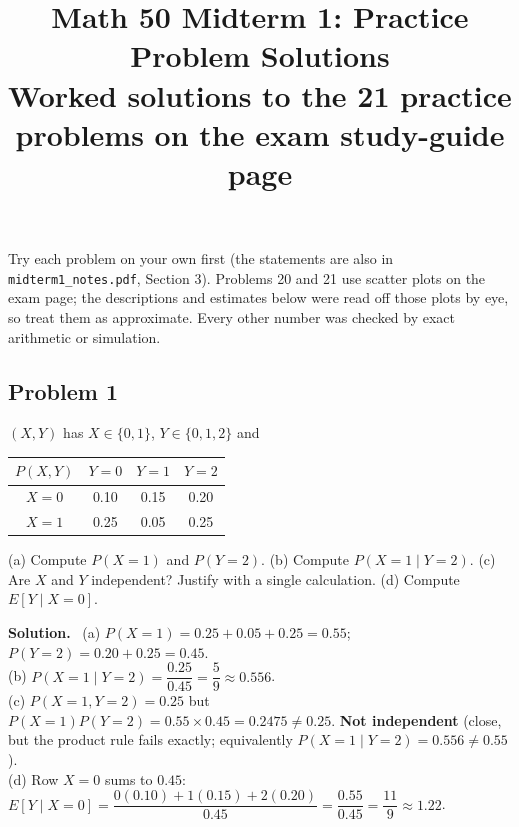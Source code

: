 \documentclass[11pt]{article}
\title{\textbf{Math 50 Midterm 1: Practice Problem Solutions}\\[2pt]\large Worked solutions to the 21 practice problems on the exam study-guide page}
\author{}
\date{}
\newenvironment{soln}{\par\smallskip\noindent\textbf{Solution.}\ }{\par\medskip}
\begin{document}
\maketitle
\thispagestyle{fancy}
\begin{tipbox}[title={Read this first}]
Try each problem on your own first (the statements are also in \texttt{midterm1\_notes.pdf}, Section 3). Problems 20 and 21 use scatter plots on the
exam page; the descriptions and estimates below were read off those plots by eye, so treat them as approximate.
Every other number was checked by exact arithmetic or simulation.
\end{tipbox}

\subsection*{Problem 1}
$(X,Y)$ has $X\in\{0,1\}$, $Y\in\{0,1,2\}$ and
\begin{center}
\begin{tabular}{c|ccc}
$P(X,Y)$ & $Y=0$ & $Y=1$ & $Y=2$\\\hline
$X=0$ & 0.10 & 0.15 & 0.20\\
$X=1$ & 0.25 & 0.05 & 0.25
\end{tabular}
\end{center}
(a) Compute $P(X=1)$ and $P(Y=2)$. (b) Compute $P(X=1\mid Y=2)$. (c) Are $X$ and $Y$ independent? Justify with a single calculation. (d) Compute $E[Y\mid X=0]$.
\begin{soln}
(a) $P(X{=}1)=0.25+0.05+0.25=0.55$; $P(Y{=}2)=0.20+0.25=0.45$.\\
(b) $P(X{=}1\mid Y{=}2)=\dfrac{0.25}{0.45}=\dfrac59\approx0.556$.\\
(c) $P(X{=}1,Y{=}2)=0.25$ but $P(X{=}1)P(Y{=}2)=0.55\times0.45=0.2475\ne0.25$. \textbf{Not independent}
(close, but the product rule fails exactly; equivalently $P(X{=}1\mid Y{=}2)=0.556\neq0.55$).\\
(d) Row $X{=}0$ sums to $0.45$: $E[Y\mid X{=}0]=\dfrac{0(0.10)+1(0.15)+2(0.20)}{0.45}=\dfrac{0.55}{0.45}=\dfrac{11}{9}\approx1.22$.
\end{soln}

\end{document}

